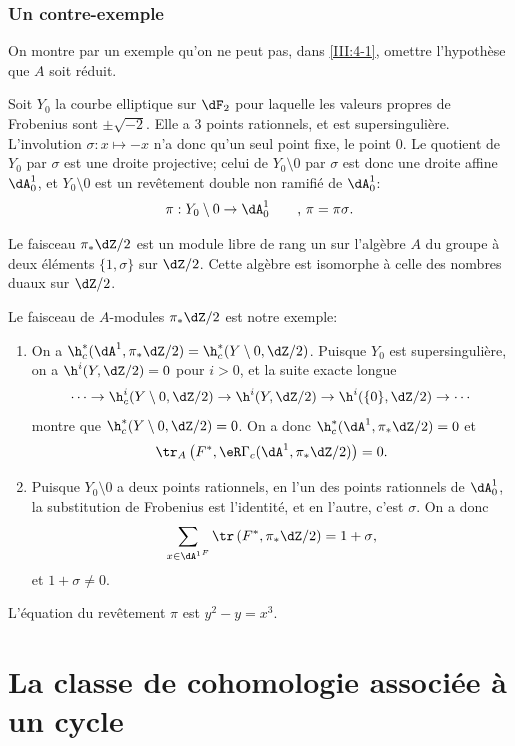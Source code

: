 \subsection{Un contre-exemple}\label{III:4-5}

On montre par un exemple qu'on ne peut pas, dans \ref{III:4-1}, omettre 
l'hypothèse que $A$ soit réduit.

Soit $Y_0$ la courbe elliptique sur $\dF_2$ pour laquelle les valeurs propres 
de Frobenius sont $\pm \sqrt{-2}$. Elle a $3$ points rationnels, et est 
supersingulière. L'involution $\sigma:x\mapsto -x$ n'a donc qu'un seul point 
fixe, le point $0$. Le quotient de $Y_0$ par $\sigma$ est une droite projective; 
celui de $Y_0\setminus 0$ par $\sigma$ est donc une droite affine $\dA_0^1$, et 
$Y_0\setminus 0$ est un revêtement double non ramifié de $\dA_0^1$:
\[
  \pi:Y_0\setminus 0 \to \dA_0^1 \qquad \text{, $\pi=\pi\sigma$.}
\]

Le faisceau $\pi_*\dZ/2$ est un module libre de rang un sur l'algèbre $A$ du 
groupe à deux éléments $\{1,\sigma\}$ sur $\dZ/2$. Cette algèbre est 
isomorphe à celle des nombres duaux sur $\dZ/2$. 

Le faisceau de $A$-modules $\pi_*\dZ/2$ est notre exemple:
\begin{enumerate}[\indent a)]
  \item On a 
    $\h_c^*(\dA^1,\pi_*\dZ/2) = \h_c^*(Y\setminus 0,\dZ/2)$. 
    Puisque $Y_0$ est supersingulière, on a $\h^i(Y,\dZ/2)=0$ pour $i>0$, et 
    la suite exacte longue 
    \[
      \cdots \to \h_c^i(Y\setminus 0,\dZ/2) \to \h^i(Y,\dZ/2) \to \h^i(\{0\},\dZ/2) \to \cdots
    \]
    montre que $\h_c^*(Y\setminus 0,\dZ/2)=0$. On a donc 
    $\h_c^*(\dA^1,\pi_*\dZ/2)=0$ et 
    \[
      \tr_A\left(F^*,\eR\Gamma_c(\dA^1,\pi_*\dZ/2)\right) = 0 \text{.}
    \]
  \item Puisque $Y_0\setminus 0$ a deux points rationnels, en l'un des points 
    rationnels de $\dA_0^1$, la substitution de Frobenius est l'identité, et 
    en l'autre, c'est $\sigma$. On a donc 
    \[
      \sum_{x\in {\dA^1}^F} \tr\left(F^*,\pi_*\dZ/2\right) = 1+\sigma \text{,}
    \]
    et $1+\sigma\ne 0$.
\end{enumerate}

L'équation du revêtement $\pi$ est $y^2-y=x^3$.

\chapter{La classe de cohomologie associée à un cycle}\label{IV}




